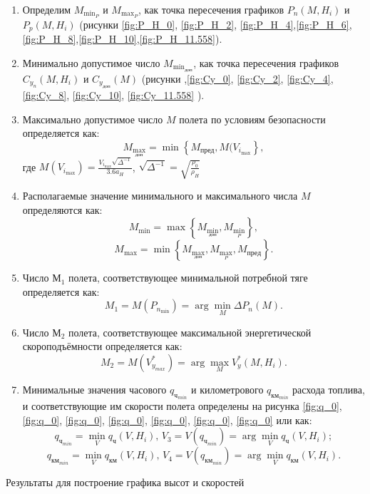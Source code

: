 \begin{enumerate}
\item Определим $M_{{\min}_P}$ и $M_{{\max}_P}$, как точка пересечения
    графиков $P_n(M, H_i)$ и $P_p(M, H_i)$ (рисунки \ref{fig:P_H_0}, \ref{fig:P_H_2},
\ref{fig:P_H_4},\ref{fig:P_H_6},\ref{fig:P_H_8},\ref{fig:P_H_10},\ref{fig:P_H_11.558}).

\item Минимально допустимое число $M_{{\min}_{доп}}$, как точка пересечения
    графиков $C_{y_n}(M, H_i)$ и $C_{y_{доп}}(M)$ (рисунки
    ,\ref{fig:Cy_0}, \ref{fig:Cy_2}, \ref{fig:Cy_4}, \ref{fig:Cy_8},
    \ref{fig:Cy_10}, \ref{fig:Cy_11.558}
    ).
\item Максимально допустимое число $M$ полета по условиям безопасности 
        определяется как: 
    \[
        M_{{\max}_{доп}} = \min \left\{ M_{пред}, M(V_{i_{\max}} \right\},
    \]
    где $M(V_{i_{\max}}) = \frac{V_{i_{\max}} \sqrt{\Delta^{-1}}}{3.6 a_H}$, 
    $\sqrt{\Delta^{-1}} = \sqrt{\frac{\rho_0}{\rho_H}}$
\item Располагаемые значение минимального и максимального числа $M$
определяются как: 
\[
    M_{\min} = \max \left\{ M_{{\min}_{доп}}, M_{{\min}_P} \right\},
\]
\[
    M_{\max} = \min \left\{ M_{{\max}_{доп}}, M_{{\max}_P}, M_{пред} \right\}.
\]
\item Число $М_1$ полета, соответствующее минимальной потребной тяге
        определяется как:
        \[
            M_1 = M(P_{n_{\min}}) = \arg \min_{M} \Delta P_n (M).
        \]
\item Число $М_2$ полета, соответствующее максимальной энергетической скороподъёмности
определяется как:
        \[
            M_2 = M(V_{y_{max}}^*) = \arg \max_{M} V_y^* (M, H_i).
        \]
\item Минимальные значения часового $q_{ч_{min}}$ и километрового
        $q_{км_{min}}$ расхода топлива, и соответствующие им скорости полета
        определены на рисунка 
        \ref{fig:q_0}, \ref{fig:q_0}, \ref{fig:q_0}, \ref{fig:q_0}, \ref{fig:q_0}, \ref{fig:q_0}, \ref{fig:q_0}
        или как:
        \[
            q_{ч_{min}} = \min_V q_ч(V, H_i), \, V_3 = V(q_{ч_{min}}) =
            \arg \min_V q_ч (V, H_i);
        \]
        \[
            q_{{км}_{min}} = \min_V q_{км}(V, H_i), \, V_4 = V(q_{{км}_{min}}) =
            \arg \min_V q_{км} (V, H_i).
        \]
\end{enumerate}

\begin{sidewaystable}
    \centering
    \caption{Результаты для построение графика высот и скоростей}
    \label{tab:H_M}
    
\end{sidewaystable}
\newpage

